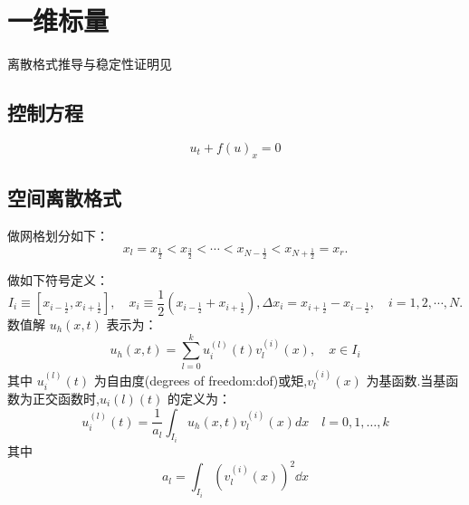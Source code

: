 \documentclass{book}
\begin{document}
\section{一维标量}
离散格式推导与稳定性证明见\cite{RN16}
\subsection{控制方程}
\begin{equation}
    u_t+f(u)_x = 0
\end{equation}
\subsection{空间离散格式}
做网格划分如下：
\begin{equation}
    x_{l}=x_{\frac{1}{2}}<x_{\frac{3}{2}}<\cdots<x_{N-\frac{1}{2}}<x_{N+\frac{1}{2}}=x_{r} .
\end{equation}

做如下符号定义：
\begin{equation}
    I_{i} \equiv\left[x_{i-\frac{1}{2}}, x_{i+\frac{1}{2}}\right], \quad x_{i} \equiv \frac{1}{2}\left(x_{i-\frac{1}{2}}+x_{i+\frac{1}{2}}\right),        \Delta x_{i}=x_{i+\frac{1}{2}}-x_{i-\frac{1}{2}}, \quad i=1,2, \cdots, N .
\end{equation}
数值解 $u_h(x,t)$ 表示为：
\begin{equation}
    u_{h}(x, t)=\sum_{l=0}^{k} u_{i}^{(l)}(t) v_{l}^{(i)}(x), \quad x \in I_{i}
\end{equation}
其中 $u_i^{(l)}(t)$ 为自由度(degrees of freedom:dof)或矩,$v_l^{(i)}(x)$ 为基函数.当基函数为正交函数时,$u_i{(l)}(t)$ 的定义为：
\begin{equation}
    u_{i}^{(l)}(t)=\frac{1}{a_{l}} \int_{I_{i}} u_{h}(x, t) v_{l}^{(i)}(x) d x \quad l=0,1, \ldots, k
\end{equation}
其中
\begin{equation}
    a_{l}=\int_{I_{i}}\left(v_{l}^{(i)}(x)\right)^{2} \dd x
\end{equation}
\end{document}
